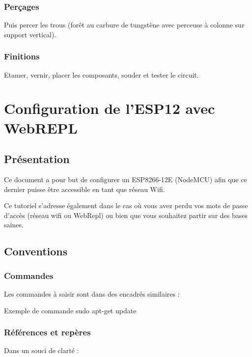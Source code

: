 {\subsection{Perçages}
Puis percer les trous (forêt au carbure de tungstène avec perceuse à colonne sur support vertical).

\subsection{Finitions}
Etamer, vernir, placer les composants, souder et tester le circuit.\chapter{Configuration de l'ESP12 avec WebREPL}     

\section{Présentation}

Ce document a pour but de configurer un ESP8266-12E (NodeMCU) afin que ce dernier puisse être accessible en tant que réseau Wifi.

Ce tutoriel s'adresse également dans le cas où vous avez perdu vos mots de passe d'accès (réseau wifi ou WebRepl) ou bien que vous souhaitez partir sur des bases saines.\\



\section{Conventions}


\subsection{Commandes}

Les commandes à saisir sont dans des encadrés similaires : \\
\begin{Bash}{Exemple de commande}
sudo apt-get update
\end{Bash}

\subsection{Références et repères}

Dans un souci de clarté : 

}
